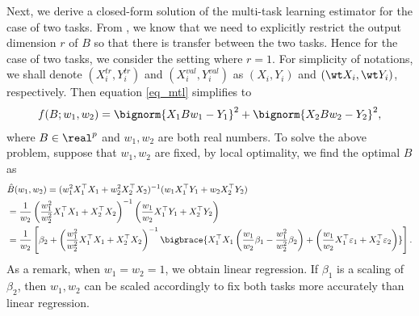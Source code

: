 \iffalse
Next, we derive a closed-form solution of the multi-task learning estimator for the case of two tasks.
From \cite{WZR20}, we know that we need to explicitly restrict the output dimension $r$ of $B$ so that there is transfer between the two tasks.
Hence for the case of two tasks, we consider the setting where $r=1$.
For simplicity of notations, we shall denote $(X_i^{tr},Y_i^{tr})$ and $(X_i^{val},Y_i^{val})$ as $(X_i,Y_i)$ and  $(\wt X_i,\wt Y_i)$, respectively. Then equation \eqref{eq_mtl} simplifies to
\begin{align}\label{eq_mtl_2task}
	f(B; w_1, w_2) = \bignorm{X_1 B w_1 - Y_1}^2 + \bignorm{X_2 B w_2 - Y_2}^2,
\end{align}
where $B\in\real^p$ and $w_1, w_2$ are both real numbers. To solve the above problem, suppose that $w_1, w_2$ are fixed, by local optimality, we find the optimal $B$ as
\begin{align}
	& \hat{B}(w_1, w_2) = (w_1^2 X_1^{\top}X_1 + w_2^2 X_2^{\top}X_2)^{-1} (w_1 X_1^{\top}Y_1 + w_2 X_2^{\top}Y_2) \label{hatB}\\
	&= \frac{1}{w_2} \left( \frac{w_1^2}{w_2^2}  X_1^{\top}X_1 + X_2^{\top}X_2\right)^{-1} \left(\frac{w_1}{w_2} X_1^{\top}Y_1 + X_2^{\top}Y_2\right) \nonumber\\
	&= \frac{1}{w_2}\left[\beta_2 + \left(\frac{w_1^2}{w_2^2} X_1^{\top}X_1 + X_2^{\top}X_2\right)^{-1}\bigbrace{X_1^{\top}X_1\left(\frac{w_1}{w_2}\beta_1 - \frac{w_1^2}{w_2^2} \beta_2\right) + \left(\frac{w_1}{w_2} X_1^{\top}\varepsilon_1 + X_2^{\top}\varepsilon_2\right)}\right]. \nonumber
\end{align}
As a remark, when $w_1 = w_2 = 1$, we obtain linear regression.
If $\beta_1$ is a scaling of $\beta_2$, then  $w_1, w_2$ can be scaled accordingly to fix both tasks more accurately than linear regression.


